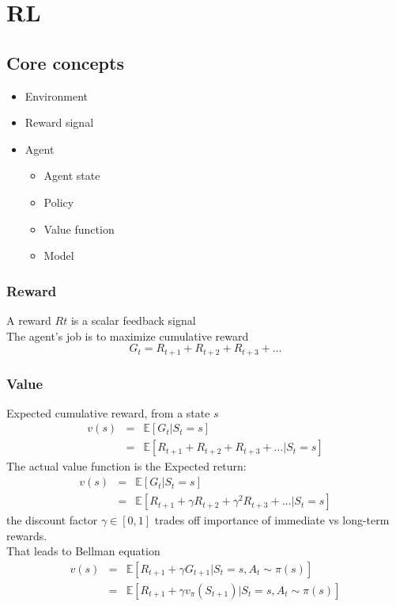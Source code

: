 \chapter{RL}
\section*{Core concepts}

\begin{itemize}
\item Environment
\item Reward signal
\item Agent
	\begin{itemize}
		\item Agent state
		\item Policy
		\item Value function
		\item Model
	\end{itemize}
\end{itemize}

\subsection*{Reward}
A reward $R{t}$ is a scalar feedback signal \\
The agent's job is to maximize cumulative reward
$$
G_t = R_{t+1}+R_{t+2}+R_{t+3}+\ldots
$$
\subsection*{Value}
Expected cumulative reward, from a state $s$
\begin{eqnarray*}
v(s) &=& \mathbb{E}[G_t|S_t=s] \\
&=& \mathbb{E}[R_{t+1}+R_{t+2}+R_{t+3}+\ldots|S_t=s]
\end{eqnarray*}
The actual value function is the Expected return:
\begin{eqnarray*}
v(s) &=& \mathbb{E}[G_t|S_t=s] \\
&=& \mathbb{E}[R_{t+1}+\gamma R_{t+2}+\gamma^2R_{t+3}+\ldots|S_t=s]
\end{eqnarray*}
the discount factor $\gamma \in [0,1]$ trades off importance of immediate vs long-term rewards. \\
That leads to Bellman equation
\begin{eqnarray*}
v(s) &=& \mathbb{E}[R_{t+1}+\gamma G_{t+1}|S_t=s,A_t\sim \pi(s)] \\
&=& \mathbb{E}[R_{t+1}+\gamma v_\pi(S_{t+1})|S_t=s,A_t\sim \pi(s)]
\end{eqnarray*}

